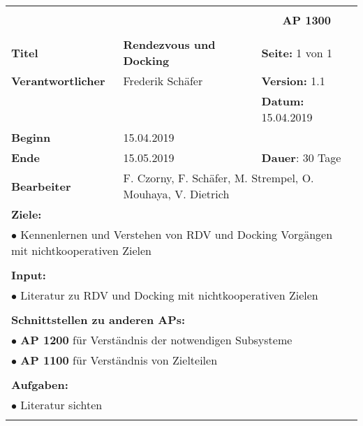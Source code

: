 \clearpage
\begin{table}[!h]
 \begin{center}
  \begin{tabular}{|p{35mm}||p{55mm}|p{50mm}||p{40mm}|}
   \hline
   \multicolumn{3}{|l||}{\textbf{}} & \multicolumn{1}{c|}{}\\
   \multicolumn{3}{|l||}{\textbf{}} & \multicolumn{1}{c|}{\textbf{AP 1300}}\\
   \multicolumn{3}{|l||}{\textbf{}} & \multicolumn{1}{c|}{}\\
   \hline\hline
   \textbf{Titel} & \multicolumn{2}{p{7cm}||}{\textbf{Rendezvous und Docking}} & \textbf{Seite:} 1 von 1\\
   \hline
   \textbf{Verantwortlicher} & \multicolumn{2}{l||}{Frederik Schäfer} & \textbf{Version:} 1.1\\
   \hline
   \multicolumn{3}{|l||}{} & \textbf{Datum:} 15.04.2019\\
   \hline\hline
   \textbf{Beginn} & \multicolumn{2}{l||}{15.04.2019} & \\
   \hline
   \textbf{Ende} & \multicolumn{2}{l||}{15.05.2019} & \textbf{Dauer}: 30 Tage\\
   \hline\hline
   \textbf{Bearbeiter} & \multicolumn{3}{l|}{F. Czorny, F. Schäfer, M. Strempel, O. Mouhaya, V. Dietrich}\\
   \hline\hline
   \multicolumn{4}{|p{150mm}|}{\textbf{Ziele:}}\\
   \multicolumn{4}{|p{150mm}|}{$\bullet$ Kennenlernen und Verstehen von RDV und Docking Vorgängen mit nichtkooperativen Zielen}\\
   \multicolumn{4}{|p{150mm}|}{}\\
   \multicolumn{4}{|p{150mm}|}{\textbf{Input:}}\\
   \multicolumn{4}{|p{150mm}|}{$\bullet$ Literatur zu RDV und Docking mit nichtkooperativen Zielen}\\
   \multicolumn{4}{|p{150mm}|}{}\\
   \multicolumn{4}{|p{150mm}|}{\textbf{Schnittstellen zu anderen APs:}}\\
   \multicolumn{4}{|p{150mm}|}{$\bullet$ \textbf{AP 1200} für Verständnis der notwendigen Subsysteme}\\
   \multicolumn{4}{|p{150mm}|}{$\bullet$ \textbf{AP 1100} für Verständnis von Zielteilen}\\
   \multicolumn{4}{|p{150mm}|}{}\\
   \multicolumn{4}{|p{150mm}|}{\textbf{Aufgaben:}}\\
   \multicolumn{4}{|p{150mm}|}{$\bullet$ Literatur sichten}\\
   \multicolumn{4}{|p{150mm}|}{}\\
   \hline
  \end{tabular}
 \end{center}
\end{table}

